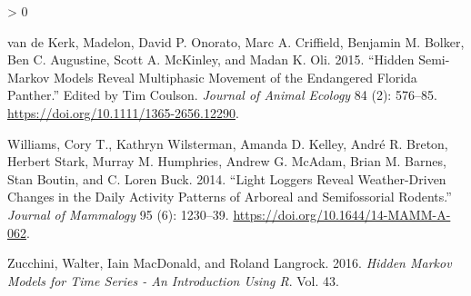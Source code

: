 \documentclass[english,msc,numbers,hidelinks]{coppe}
\newlength{\cslhangindent}
\newenvironment{CSLReferences}[2] %
 {%
  \setlength{\parindent}{0pt}
  \ifodd #1 \everypar{\setlength{\hangindent}{\cslhangindent}}\ignorespaces\fi
  \ifnum #2 > 0
  \setlength{\parskip}{#2\baselineskip}
  \fi
 }%
 {}
\begin{document}
\begin{CSLReferences}{1}{0}
  \leavevmode\hypertarget{ref-vandekerk2015}{}%
  van de Kerk, Madelon, David P. Onorato, Marc A. Criffield, Benjamin M. Bolker, Ben C. Augustine, Scott A. McKinley, and Madan K. Oli. 2015. {``Hidden Semi-Markov Models Reveal Multiphasic Movement of the Endangered Florida Panther.''} Edited by Tim Coulson. \emph{Journal of Animal Ecology} 84 (2): 576--85. \url{https://doi.org/10.1111/1365-2656.12290}.

  \leavevmode\hypertarget{ref-williams2014}{}%
  Williams, Cory T., Kathryn Wilsterman, Amanda D. Kelley, André R. Breton, Herbert Stark, Murray M. Humphries, Andrew G. McAdam, Brian M. Barnes, Stan Boutin, and C. Loren Buck. 2014. {``Light Loggers Reveal Weather-Driven Changes in the Daily Activity Patterns of Arboreal and Semifossorial Rodents.''} \emph{Journal of Mammalogy} 95 (6): 1230--39. \url{https://doi.org/10.1644/14-MAMM-A-062}.

  \leavevmode\hypertarget{ref-zucchini2016}{}%
  Zucchini, Walter, Iain MacDonald, and Roland Langrock. 2016. \emph{Hidden Markov Models for Time Series - An Introduction Using R}. Vol. 43.

  \end{CSLReferences}
\end{document}
